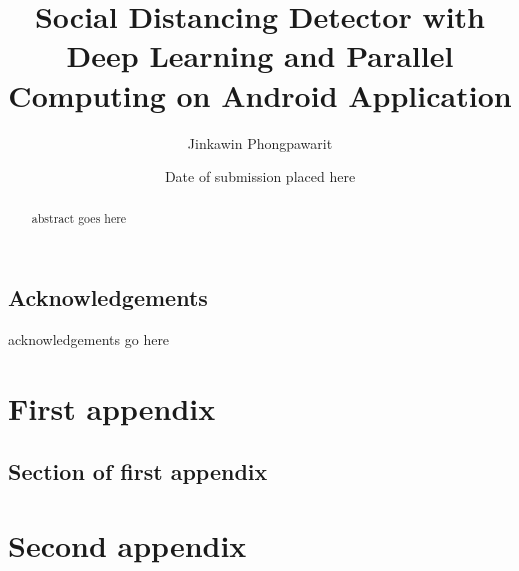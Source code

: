 \documentclass{mproj}
\begin{document}
\title{Social Distancing Detector with Deep Learning and Parallel Computing on Android Application}
\author{Jinkawin Phongpawarit}
\date{Date of submission placed here}
\maketitle

\begin{abstract}
abstract goes here
\end{abstract}

\educationalconsent


\newpage
\section*{Acknowledgements}

acknowledgements go here

\tableofcontents












\appendix %
\chapter{First appendix}

\section{Section of first appendix}

\chapter{Second appendix}



\end{document}
